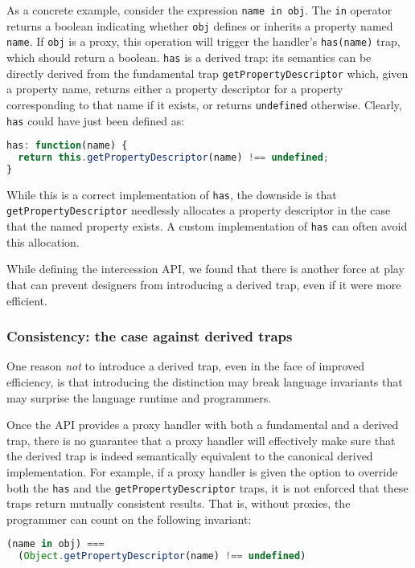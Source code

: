 \documentclass{acm_proc_article-sp}
\begin{document}
As a concrete example, consider the expression \texttt{name in obj}. The \texttt{in} operator returns a boolean indicating whether \texttt{obj} defines or inherits a property named \texttt{name}. If \texttt{obj} is a proxy, this operation will trigger the handler's \texttt{has(name)} trap, which should return a boolean. \texttt{has} is a derived trap: its semantics can be directly derived from the fundamental trap \texttt{getPropertyDescriptor} which, given a property name, returns either a property descriptor for a property corresponding to that name if it exists, or returns \texttt{undefined} otherwise. Clearly, \texttt{has} could have just been defined as:

\begin{lstlisting}[language=javascript]
has: function(name) {
  return this.getPropertyDescriptor(name) !== undefined;
}
\end{lstlisting}

While this is a correct implementation of \texttt{has}, the downside is that \texttt{getPropertyDescriptor} needlessly allocates a property descriptor in the case that the named property exists. A custom implementation of \texttt{has} can often avoid this allocation.

While defining the intercession API, we found that there is another force at play that can prevent designers from introducing a derived trap, even if it were more efficient.

\subsubsection{Consistency: the case against derived traps}

One reason \emph{not} to introduce a derived trap, even in the face of improved efficiency, is that introducing the distinction may break language invariants that may surprise the language runtime and programmers.

Once the API provides a proxy handler with both a fundamental and a derived trap, there is no guarantee that a proxy handler will effectively make sure that the derived trap is indeed semantically equivalent to the canonical derived implementation. For example, if a proxy handler is given the option to override both the \texttt{has} and the \texttt{getPropertyDescriptor} traps, it is not enforced that these traps return mutually consistent results. That is, without proxies, the programmer can count on the following invariant:

\begin{lstlisting}[language=javascript]
(name in obj) ===
  (Object.getPropertyDescriptor(name) !== undefined)
\end{lstlisting}
\end{document}
